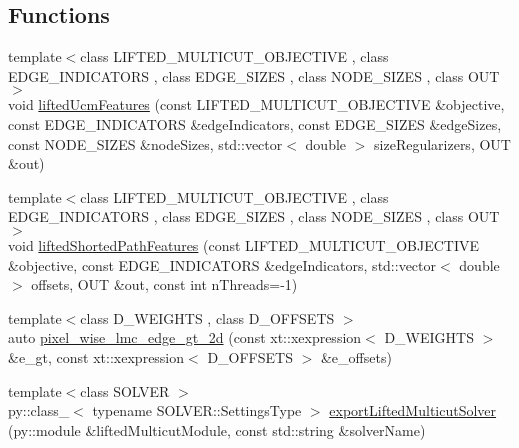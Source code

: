 \subsection*{Functions}
\begin{DoxyCompactItemize}
\item 
{\footnotesize template$<$class L\+I\+F\+T\+E\+D\+\_\+\+M\+U\+L\+T\+I\+C\+U\+T\+\_\+\+O\+B\+J\+E\+C\+T\+I\+VE , class E\+D\+G\+E\+\_\+\+I\+N\+D\+I\+C\+A\+T\+O\+RS , class E\+D\+G\+E\+\_\+\+S\+I\+Z\+ES , class N\+O\+D\+E\+\_\+\+S\+I\+Z\+ES , class O\+UT $>$ }\\void \hyperlink{namespacenifty_1_1graph_1_1opt_1_1lifted__multicut_a65f5a56b03ea304933a314eae9078f0d}{lifted\+Ucm\+Features} (const L\+I\+F\+T\+E\+D\+\_\+\+M\+U\+L\+T\+I\+C\+U\+T\+\_\+\+O\+B\+J\+E\+C\+T\+I\+VE \&objective, const E\+D\+G\+E\+\_\+\+I\+N\+D\+I\+C\+A\+T\+O\+RS \&edge\+Indicators, const E\+D\+G\+E\+\_\+\+S\+I\+Z\+ES \&edge\+Sizes, const N\+O\+D\+E\+\_\+\+S\+I\+Z\+ES \&node\+Sizes, std\+::vector$<$ double $>$ size\+Regularizers, O\+UT \&out)
\item 
{\footnotesize template$<$class L\+I\+F\+T\+E\+D\+\_\+\+M\+U\+L\+T\+I\+C\+U\+T\+\_\+\+O\+B\+J\+E\+C\+T\+I\+VE , class E\+D\+G\+E\+\_\+\+I\+N\+D\+I\+C\+A\+T\+O\+RS , class E\+D\+G\+E\+\_\+\+S\+I\+Z\+ES , class N\+O\+D\+E\+\_\+\+S\+I\+Z\+ES , class O\+UT $>$ }\\void \hyperlink{namespacenifty_1_1graph_1_1opt_1_1lifted__multicut_aa59f63a687c2d9216d3abd0d9926e06c}{lifted\+Shorted\+Path\+Features} (const L\+I\+F\+T\+E\+D\+\_\+\+M\+U\+L\+T\+I\+C\+U\+T\+\_\+\+O\+B\+J\+E\+C\+T\+I\+VE \&objective, const E\+D\+G\+E\+\_\+\+I\+N\+D\+I\+C\+A\+T\+O\+RS \&edge\+Indicators, std\+::vector$<$ double $>$ offsets, O\+UT \&out, const int n\+Threads=-\/1)
\item 
{\footnotesize template$<$class D\+\_\+\+W\+E\+I\+G\+H\+TS , class D\+\_\+\+O\+F\+F\+S\+E\+TS $>$ }\\auto \hyperlink{namespacenifty_1_1graph_1_1opt_1_1lifted__multicut_a1f91d320198cd16ee6b0867a08f1e09e}{pixel\+\_\+wise\+\_\+lmc\+\_\+edge\+\_\+gt\+\_\+2d} (const xt\+::xexpression$<$ D\+\_\+\+W\+E\+I\+G\+H\+TS $>$ \&e\+\_\+gt, const xt\+::xexpression$<$ D\+\_\+\+O\+F\+F\+S\+E\+TS $>$ \&e\+\_\+offsets)
\item 
{\footnotesize template$<$class S\+O\+L\+V\+ER $>$ }\\py\+::class\+\_\+$<$ typename S\+O\+L\+V\+E\+R\+::\+Settings\+Type $>$ \hyperlink{namespacenifty_1_1graph_1_1opt_1_1lifted__multicut_a6f456f29118031b4510e2b92fc4af8df}{export\+Lifted\+Multicut\+Solver} (py\+::module \&lifted\+Multicut\+Module, const std\+::string \&solver\+Name)
\end{DoxyCompactItemize}


